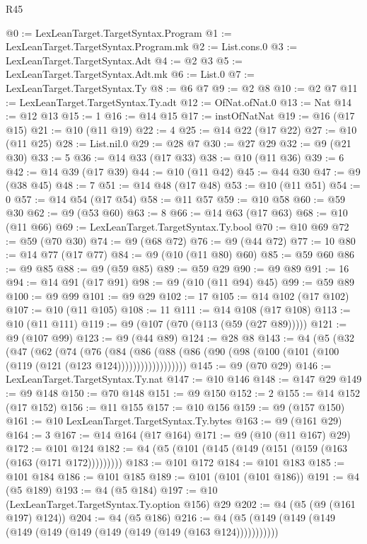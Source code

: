 \begin{lexlean}{R45}
\begin{coremodule}
@0 := LexLeanTarget.TargetSyntax.Program
@1 := LexLeanTarget.TargetSyntax.Program.mk
@2 := List.cons.{0}
@3 := LexLeanTarget.TargetSyntax.Adt
@4 := @2 @3
@5 := LexLeanTarget.TargetSyntax.Adt.mk
@6 := List.{0}
@7 := LexLeanTarget.TargetSyntax.Ty
@8 := @6 @7
@9 := @2 @8
@10 := @2 @7
@11 := LexLeanTarget.TargetSyntax.Ty.adt
@12 := OfNat.ofNat.{0}
@13 := Nat
@14 := @12 @13
@15 := 1
@16 := @14 @15
@17 := instOfNatNat
@19 := @16 (@17 @15)
@21 := @10 (@11 @19)
@22 := 4
@25 := @14 @22 (@17 @22)
@27 := @10 (@11 @25)
@28 := List.nil.{0}
@29 := @28 @7
@30 := @27 @29
@32 := @9 (@21 @30)
@33 := 5
@36 := @14 @33 (@17 @33)
@38 := @10 (@11 @36)
@39 := 6
@42 := @14 @39 (@17 @39)
@44 := @10 (@11 @42)
@45 := @44 @30
@47 := @9 (@38 @45)
@48 := 7
@51 := @14 @48 (@17 @48)
@53 := @10 (@11 @51)
@54 := 0
@57 := @14 @54 (@17 @54)
@58 := @11 @57
@59 := @10 @58
@60 := @59 @30
@62 := @9 (@53 @60)
@63 := 8
@66 := @14 @63 (@17 @63)
@68 := @10 (@11 @66)
@69 := LexLeanTarget.TargetSyntax.Ty.bool
@70 := @10 @69
@72 := @59 (@70 @30)
@74 := @9 (@68 @72)
@76 := @9 (@44 @72)
@77 := 10
@80 := @14 @77 (@17 @77)
@84 := @9 (@10 (@11 @80) @60)
@85 := @59 @60
@86 := @9 @85
@88 := @9 (@59 @85)
@89 := @59 @29
@90 := @9 @89
@91 := 16
@94 := @14 @91 (@17 @91)
@98 := @9 (@10 (@11 @94) @45)
@99 := @59 @89
@100 := @9 @99
@101 := @9 @29
@102 := 17
@105 := @14 @102 (@17 @102)
@107 := @10 (@11 @105)
@108 := 11
@111 := @14 @108 (@17 @108)
@113 := @10 (@11 @111)
@119 := @9 (@107 (@70 (@113 (@59 (@27 @89)))))
@121 := @9 (@107 @99)
@123 := @9 (@44 @89)
@124 := @28 @8
@143 := @4
    (@5
      (@32
        (@47
          (@62
            (@74
              (@76
                (@84
                  (@86
                    (@88 (@86 (@90 (@98 (@100 (@101 (@100 (@119 (@121 (@123 @124))))))))))))))))))
@145 := @9 (@70 @29)
@146 := LexLeanTarget.TargetSyntax.Ty.nat
@147 := @10 @146
@148 := @147 @29
@149 := @9 @148
@150 := @70 @148
@151 := @9 @150
@152 := 2
@155 := @14 @152 (@17 @152)
@156 := @11 @155
@157 := @10 @156
@159 := @9 (@157 @150)
@161 := @10 LexLeanTarget.TargetSyntax.Ty.bytes
@163 := @9 (@161 @29)
@164 := 3
@167 := @14 @164 (@17 @164)
@171 := @9 (@10 (@11 @167) @29)
@172 := @101 @124
@182 := @4 (@5 (@101 (@145 (@149 (@151 (@159 (@163 (@163 (@171 @172)))))))))
@183 := @101 @172
@184 := @101 @183
@185 := @101 @184
@186 := @101 @185
@189 := @101 (@101 (@101 @186))
@191 := @4 (@5 @189)
@193 := @4 (@5 @184)
@197 := @10 (LexLeanTarget.TargetSyntax.Ty.option @156) @29
@202 := @4 (@5 (@9 (@161 @197) @124))
@204 := @4 (@5 @186)
@216 := @4 (@5 (@149 (@149 (@149 (@149 (@149 (@149 (@149 (@149 (@149 (@163 @124)))))))))))

\end{coremodule}
\end{lexlean}
